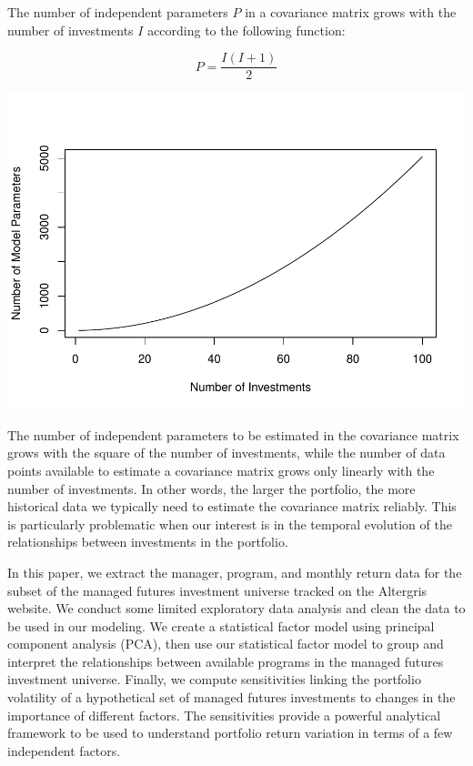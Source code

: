 \documentclass[]{article}
\begin{document}
The number of independent parameters \(P\) in a covariance matrix grows
with the number of investments \(I\) according to the following
function:

\[P=\frac{I\left(I+1\right)}{2}\]

\includegraphics{diversificationInTheManagedFuturesUniverse_files/figure-latex/unnamed-chunk-6-1.pdf}

The number of independent parameters to be estimated in the covariance
matrix grows with the square of the number of investments, while the
number of data points available to estimate a covariance matrix grows
only linearly with the number of investments. In other words, the larger
the portfolio, the more historical data we typically need to estimate
the covariance matrix reliably. This is particularly problematic when
our interest is in the temporal evolution of the relationships between
investments in the portfolio.

In this paper, we extract the manager, program, and monthly return data
for the subset of the managed futures investment universe tracked on the
Altergris website. We conduct some limited exploratory data analysis and
clean the data to be used in our modeling. We create a statistical
factor model using principal component analysis (PCA), then use our
statistical factor model to group and interpret the relationships
between available programs in the managed futures investment universe.
Finally, we compute sensitivities linking the portfolio volatility of a
hypothetical set of managed futures investments to changes in the
importance of different factors. The sensitivities provide a powerful
analytical framework to be used to understand portfolio return variation
in terms of a few independent factors.
\end{document}
